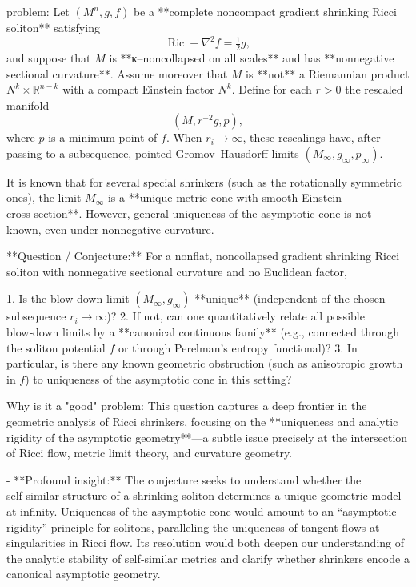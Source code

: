 problem:  
Let \((M^n,g,f)\) be a **complete noncompact gradient shrinking Ricci soliton** satisfying  
\[
\operatorname{Ric} + \nabla^2 f = \tfrac12 g,
\]
and suppose that \(M\) is **κ–noncollapsed on all scales** and has **nonnegative sectional curvature**. Assume moreover that \(M\) is **not** a Riemannian product \(N^k\times\mathbb{R}^{n-k}\) with a compact Einstein factor \(N^k\).  
Define for each \(r>0\) the rescaled manifold  
\[
(M, r^{-2} g, p),
\]
where \(p\) is a minimum point of \(f\). When \(r_i\to\infty\), these rescalings have, after passing to a subsequence, pointed Gromov–Hausdorff limits \((M_\infty,g_\infty,p_\infty)\).  

It is known that for several special shrinkers (such as the rotationally symmetric ones), the limit \(M_\infty\) is a **unique metric cone with smooth Einstein cross‑section**. However, general uniqueness of the asymptotic cone is not known, even under nonnegative curvature.  

**Question / Conjecture:**  
For a nonflat, noncollapsed gradient shrinking Ricci soliton with nonnegative sectional curvature and no Euclidean factor,  

1. Is the blow‑down limit \((M_\infty,g_\infty)\) **unique** (independent of the chosen subsequence \(r_i\to\infty\))?  
2. If not, can one quantitatively relate all possible blow‑down limits by a **canonical continuous family** (e.g., connected through the soliton potential \(f\) or through Perelman’s entropy functional)?  
3. In particular, is there any known geometric obstruction (such as anisotropic growth in \(f\)) to uniqueness of the asymptotic cone in this setting?  

Why is it a "good" problem:  
This question captures a deep frontier in the geometric analysis of Ricci shrinkers, focusing on the **uniqueness and analytic rigidity of the asymptotic geometry**—a subtle issue precisely at the intersection of Ricci flow, metric limit theory, and curvature geometry.

- **Profound insight:**  
  The conjecture seeks to understand whether the self‑similar structure of a shrinking soliton determines a unique geometric model at infinity. Uniqueness of the asymptotic cone would amount to an “asymptotic rigidity” principle for solitons, paralleling the uniqueness of tangent flows at singularities in Ricci flow. Its resolution would both deepen our understanding of the analytic stability of self‑similar metrics and clarify whether shrinkers encode a canonical asymptotic geometry.

